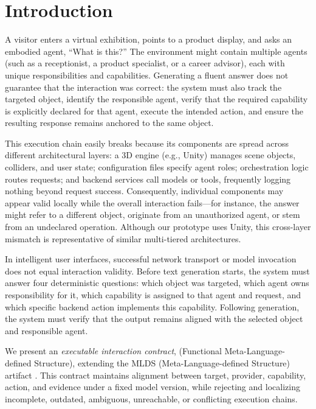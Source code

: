 \section{Introduction}
\label{sec:introduction}

A visitor enters a virtual exhibition, points to a product display, and asks an
embodied agent, ``What is this?'' The environment might contain multiple agents
(such as a receptionist, a product specialist, or a career advisor), each with
unique responsibilities and capabilities. Generating a fluent answer does not
guarantee that the interaction was correct: the system must also track the
targeted object, identify the responsible agent, verify that the required
capability is explicitly declared for that agent, execute the intended action,
and ensure the resulting response remains anchored to the same object.

This execution chain easily breaks because its components are spread across
different architectural layers: a 3D engine (e.g., Unity) manages scene objects,
colliders, and user state; configuration files specify agent roles;
orchestration logic routes requests; and backend services call models or tools,
frequently logging nothing beyond request success. Consequently, individual
components may appear valid locally while the overall interaction fails---for
instance, the answer might refer to a different object, originate from an
unauthorized agent, or stem from an undeclared operation. Although our prototype
uses Unity, this cross-layer mismatch is representative of similar multi-tiered
architectures.

In intelligent user interfaces, successful network transport or model invocation
does not equal interaction validity. Before text generation starts, the system
must answer four deterministic questions: which object was targeted, which
agent owns responsibility for it, which capability is assigned to that agent
and request, and which specific backend action implements this capability.
Following generation, the system must verify that the output remains aligned
with the selected object and responsible agent.

We present an \emph{executable interaction contract}, \systemname{}
(Functional Meta-Language-defined Structure), extending the MLDS
(Meta-Language-defined Structure) artifact \cite{fischer2025machinereadable}.
This contract maintains alignment between target, provider, capability, action,
and evidence under a fixed model version, while rejecting and localizing
incomplete, outdated, ambiguous, unreachable, or conflicting execution chains.

